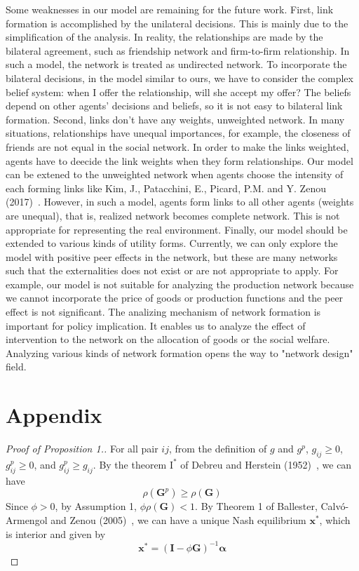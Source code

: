 \documentclass[12pt]{article}
\theoremstyle{definition}
\newcommand{\bm}[1]{\boldsymbol{#1}}
\begin{document}
Some weaknesses in our model are remaining for the future work.
First, link formation is accomplished by the unilateral decisions.
This is mainly due to the simplification of the analysis.
In reality, the relationships are made by the bilateral agreement, such as friendship network and firm-to-firm relationship.
In such a model, the network is treated as undirected network.
To incorporate the bilateral decisions, in the model similar to ours, we have to consider the complex belief system: when I offer the relationship, will she accept my offer?
The beliefs depend on other agents' decisions and beliefs, so it is not easy to bilateral link formation.
Second, links don't have any weights, unweighted network.
In many situations, relationships have unequal importances, for example, the closeness of friends are not equal in the social network.
In order to make the links weighted, agents have to deecide the link weights when they form relationships.
Our model can be extened to the unweighted network when agents choose the intensity of each forming links like Kim, J., Patacchini, E., Picard, P.M. and Y. Zenou (2017)~\cite{Urban}.
However, in such a model, agents form links to all other agents (weights are unequal), that is, realized network becomes complete network.
This is not appropriate for representing the real environment.
Finally, our model should be extended to various kinds of utility forms.
Currently, we can only explore the model with positive peer effects in the network, but these are many networks such that the externalities does not exist or are not appropriate to apply.
For example, our model is not suitable for analyzing the production network because we cannot incorporate the price of goods or production functions and the peer effect is not significant.
The analizing mechanism of network formation is important for policy implication.
It enables us to analyze the effect of intervention to the network on the allocation of goods or the social welfare.
Analyzing various kinds of network formation opens the way to "network design" field.

\appendix

\section{Appendix}

\begin{proof}[Proof of Proposition 1.]
	For all pair $ij$, from the definition of $g$ and $g^p$, $g_{ij} \ge 0$, $g_{ij}^p \ge 0$, and $g_{ij}^p \ge g_{ij}$.
	By the theorem $\text{I}^*$ of Debreu and Herstein (1952)~\cite{debreu}, we can have
	\[ \rho(\bm{G}^p) \ge \rho(\bm{G})  \]
	Since $\phi > 0$, by Assumption 1, $\phi \rho(\bm{G}) < 1$.
	By Theorem 1 of Ballester, Calv\'{o}-Armengol and Zenou (2005)~\cite{whowho}, we can have a unique Nash equilibrium $\bm{x}^*$, which is interior and given by
	\[ \bm{x}^* = {(\bm{I} - \phi \bm{G})}^{-1} \bm{\alpha} \] 
\end{proof}
\end{document}
